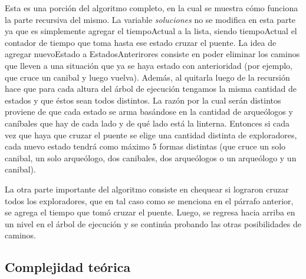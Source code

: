             Esta es una porción del algoritmo completo, en la cual se muestra cómo funciona la parte recursiva del mismo. La variable \emph{soluciones} no se modifica en esta parte ya que es simplemente agregar el tiempoActual a la lista, siendo tiempoActual el contador de tiempo que toma hasta ese estado cruzar el puente. La idea de agregar nuevoEstado a EstadosAnterirores consiste en poder eliminar los caminos que lleven a una situación que ya se haya estado con anterioridad (por ejemplo, que cruce un canibal y luego vuelva). Además, al quitarla luego de la recursión hace que para cada altura del árbol de ejecución tengamos la misma cantidad de estados y que éstos sean todos distintos. La razón por la cual serán distintos proviene de que cada estado se arma basándose en la cantidad de arqueólogos y caníbales que hay de cada lado y de qué lado está la linterna. Entonces si cada vez que haya que cruzar el puente se elige una cantidad distinta de exploradores, cada nuevo estado tendrá como máximo 5 formas distintas (que cruce un solo canibal, un solo arqueólogo, dos canibales, dos arqueólogos o un arqueólogo y un canibal).

            La otra parte importante del algoritmo consiste en chequear si lograron cruzar todos los exploradores, que en tal caso como se menciona en el párrafo anterior, se agrega el tiempo que tomó cruzar el puente. Luego, se regresa hacia arriba en un nivel en el árbol de ejecución y se continúa probando las otras posibilidades de caminos.



    \subsection{Complejidad teórica}

